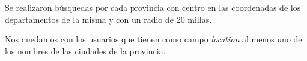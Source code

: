 \begin{frame}[t]
\begin{columns}
\end{columns}

Se realizaron búsquedas por cada provincia con centro en las coordenadas de los departamentos de la misma y con un radio de 20 millas. 

Nos quedamos con los usuarios que tienen como campo \textit{location} al menos uno de los nombres de las ciudades de la provincia. 



\end{frame}




